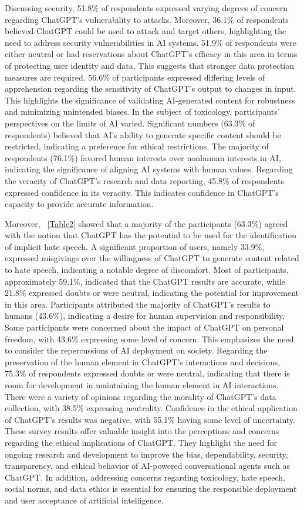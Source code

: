\documentclass[sigconf]{acmart}
\begin{document}
Discussing security, 51.8\% of respondents expressed varying degrees of concern regarding ChatGPT's vulnerability to attacks. Moreover, 36.1\% of respondents believed ChatGPT could be used to attack and target others, highlighting the need to address security vulnerabilities in AI systems. 51.9\% of respondents were either neutral or had reservations about ChatGPT's efficacy in this area in terms of protecting user identity and data. This suggests that stronger data protection measures are required. 56.6\% of participants expressed differing levels of apprehension regarding the sensitivity of ChatGPT's output to changes in input. This highlights the significance of validating AI-generated content for robustness and minimizing unintended biases. In the subject of toxicology, participants' perspectives on the limits of AI varied. Significant numbers (63.3\% of respondents) believed that AI's ability to generate specific content should be restricted, indicating a preference for ethical restrictions. The majority of respondents (76.1\%) favored human interests over nonhuman interests in AI, indicating the significance of aligning AI systems with human values. Regarding the veracity of ChatGPT's research and data reporting, 45.8\% of respondents expressed confidence in its veracity. This indicates confidence in ChatGPT's capacity to provide accurate information.

Moreover, ~\autoref{Table2} showed that a majority of the participants (63.3\%) agreed with the notion that ChatGPT has the potential to be used for the identification of implicit hate speech. A significant proportion of users, namely 33.9\%, expressed misgivings over the willingness of ChatGPT to generate content related to hate speech, indicating a notable degree of discomfort. Most of participants, approximately 59.1\%, indicated that the ChatGPT results are accurate, while 21.8\% expressed doubts or were neutral, indicating the potential for improvement in this area. Participants attributed the majority of ChatGPT's results to humans (43.6\%), indicating a desire for human supervision and responsibility. Some participants were concerned about the impact of ChatGPT on personal freedom, with 43.6\% expressing some level of concern. This emphasizes the need to consider the repercussions of AI deployment on society. Regarding the preservation of the human element in ChatGPT's interactions and decisions, 75.3\% of respondents expressed doubts or were neutral, indicating that there is room for development in maintaining the human element in AI interactions. There were a variety of opinions regarding the morality of ChatGPT's data collection, with 38.5\% expressing neutrality. Confidence in the ethical application of ChatGPT's results was negative, with 55.1\% having some level of uncertainty. These survey results offer valuable insight into the perceptions and concerns regarding the ethical implications of ChatGPT. They highlight the need for ongoing research and development to improve the bias, dependability, security, transparency, and ethical behavior of AI-powered conversational agents such as ChatGPT. In addition, addressing concerns regarding toxicology, hate speech, social norms, and data ethics is essential for ensuring the responsible deployment and user acceptance of artificial intelligence.
\end{document}
